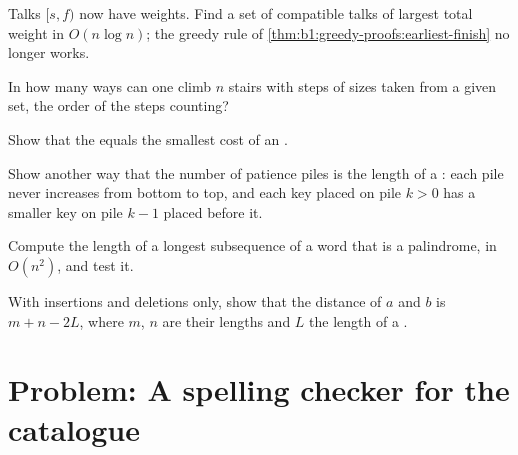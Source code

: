 \begin{exercise}[$\star\star$]\label{exo:b1:dynamic-programming:7}
Talks $[s, f)$ now have weights. Find a set of compatible talks of largest total weight in $O(n \log n)$; the greedy rule
of \cref{thm:b1:greedy-proofs:earliest-finish} no longer works.
\end{exercise}

\begin{exercise}[$\star\star$]\label{exo:b1:dynamic-programming:8}
In how many ways can one climb $n$ stairs with steps of sizes taken from a given set, the order of the steps counting?
\end{exercise}

\begin{exercise}[$\star\star$]\label{exo:b1:dynamic-programming:9}
Show that the  equals the smallest cost of an .
\end{exercise}

\begin{exercise}[$\star\star\star$]\label{exo:b1:dynamic-programming:10}
Show another way that the number of patience piles is the length of a : each pile
never increases from bottom to top, and each key placed on pile $k > 0$ has a smaller key on pile $k - 1$ placed before it.
\end{exercise}

\begin{exercise}[$\star\star\star$]\label{exo:b1:dynamic-programming:11}
Compute the length of a longest subsequence of a word that is a palindrome, in $O(n^2)$, and test it.
\end{exercise}

\begin{exercise}[$\star\star\star$]\label{exo:b1:dynamic-programming:12}
With insertions and deletions only, show that the distance of $a$ and $b$ is $m + n - 2L$, where $m$, $n$ are their
lengths and $L$ the length of a .
\end{exercise}

\section{Problem: A spelling checker for the catalogue}\label{sec:b1:dynamic-programming:problem}

